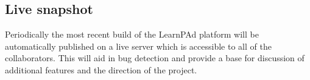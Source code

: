 \subsection{Live snapshot}
\label{sec:live-snapshot}

Periodically the most recent build of the LearnPAd platform will be automatically published on a live server which is accessible to all of the collaborators. This will aid in bug detection and provide a base for discussion of additional features and the direction of the project.
